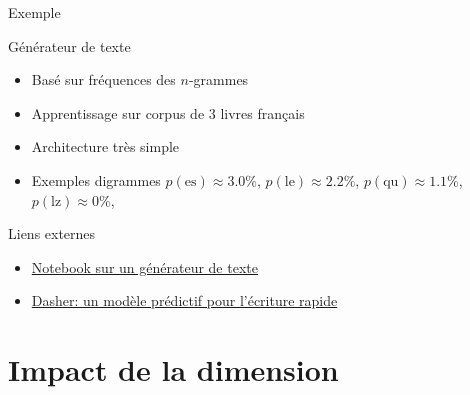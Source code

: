 \documentclass[presentation, aspectratio=169]{beamer}
\begin{document}
\begin{frame}{Exemple}
  \begin{block}{Générateur de texte}
    \begin{itemize}
    \item Basé sur fréquences des $n$-grammes
    \item Apprentissage sur corpus de 3 livres français
    \item Architecture très simple
    \item Exemples digrammes $p(\text{es}) \approx 3.0\%$,
      $p(\text{le}) \approx 2.2\%$, $p(\text{qu}) \approx 1.1\%$,
      $p(\text{lz}) \approx 0\%$,
    \end{itemize}
  \end{block}

  \begin{block}{Liens externes}
    \begin{itemize}
    \item
      \href{https://github.com/alban-goupil/jc-fare-2025/blob/main/notebooks/3-modele-generateur.ipynb}{Notebook
        sur un générateur de texte}
    \item \href{https://www.inference.org.uk/dasher}{Dasher: un modèle
        prédictif pour l'écriture rapide}
    \end{itemize}
  \end{block}
\end{frame}


\section{Impact de la dimension}
\end{document}
